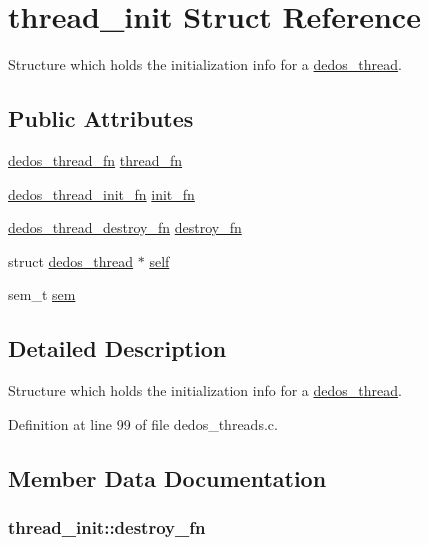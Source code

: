 \hypertarget{structthread__init}{\section{thread\-\_\-init Struct Reference}
\label{structthread__init}
}


Structure which holds the initialization info for a \hyperlink{structdedos__thread}{dedos\-\_\-thread}.  


\subsection*{Public Attributes}
\begin{DoxyCompactItemize}
\item 
\hyperlink{dedos__threads_8h_abc395397d24e50b8932e864465a17aa5}{dedos\-\_\-thread\-\_\-fn} \hyperlink{structthread__init_abbea592e098189df8940eb597cb53ecc}{thread\-\_\-fn}
\item 
\hyperlink{dedos__threads_8h_a05cf7cb0c2d44afe48767196d7554f55}{dedos\-\_\-thread\-\_\-init\-\_\-fn} \hyperlink{structthread__init_a3f5a046298ba770824a83f652ddbc7ae}{init\-\_\-fn}
\item 
\hyperlink{dedos__threads_8h_a8c7746e69f0ed91647b8d28e3e660c2a}{dedos\-\_\-thread\-\_\-destroy\-\_\-fn} \hyperlink{structthread__init_a29d61655e6d0917cc7e0293a596b4e84}{destroy\-\_\-fn}
\item 
struct \hyperlink{structdedos__thread}{dedos\-\_\-thread} $\ast$ \hyperlink{structthread__init_a35c0110fa8e8385bd0c6e823a7e5c30a}{self}
\item 
sem\-\_\-t \hyperlink{structthread__init_a609ec6696aaa7d760a8154ddee7e8a49}{sem}
\end{DoxyCompactItemize}


\subsection{Detailed Description}
Structure which holds the initialization info for a \hyperlink{structdedos__thread}{dedos\-\_\-thread}. 

Definition at line 99 of file dedos\-\_\-threads.\-c.



\subsection{Member Data Documentation}
\hypertarget{structthread__init_a29d61655e6d0917cc7e0293a596b4e84}{
\subsubsection[{destroy\-\_\-fn}]{ thread\-\_\-init\-::destroy\-\_\-fn}}\label{structthread__init_a29d61655e6d0917cc7e0293a596b4e84}



